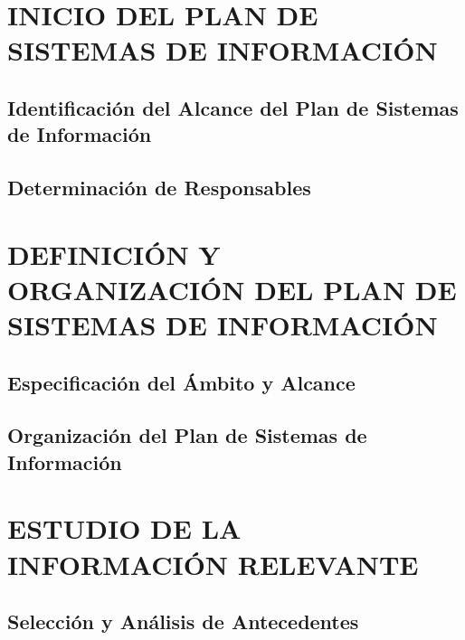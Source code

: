 
\section{INICIO DEL PLAN DE SISTEMAS DE INFORMACIÓN}
 
\subsection{Identificación del Alcance del Plan de Sistemas de Información }


\subsection{Determinación de Responsables}


\newpage
\section{DEFINICIÓN Y ORGANIZACIÓN DEL PLAN DE SISTEMAS DE INFORMACIÓN}
 

\subsection{Especificación del Ámbito y Alcance} 


\subsection{Organización del Plan de Sistemas de Información }



\newpage
\section{ESTUDIO DE LA INFORMACIÓN RELEVANTE}
 
\subsection{Selección y Análisis de Antecedentes} 

